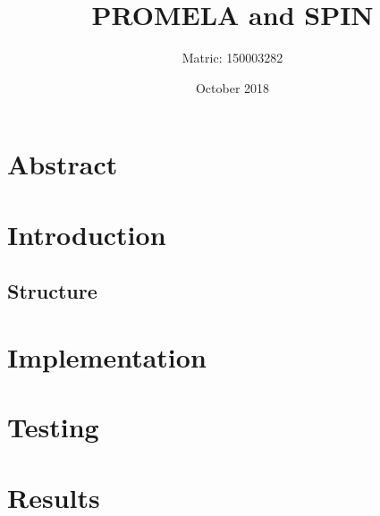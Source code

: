 \documentclass[a4paper,11pt]{article}
\title{PROMELA and SPIN}
\author{Matric: 150003282}
\date{October 2018}
\begin{document}
	
	\maketitle
	\section*{Abstract}
	
	\pagebreak
	\section{Introduction}
	\subsection{Structure}
	
	\section{Implementation}
	
	\section{Testing}
	
	\section{Results}
	
	\pagebreak
	\begin{thebibliography}{9}
		
		
		
		
		
	\end{thebibliography}
\end{document}
